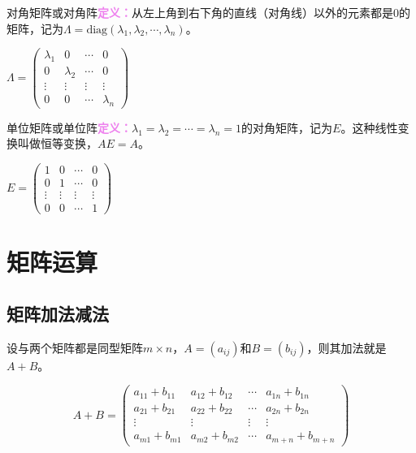 \documentclass[UTF8, 12pt]{ctexart}
\begin{document}
\begin{multicols}{2}
    
    
    对角矩阵或对角阵\textcolor{violet}{\textbf{定义：}}从左上角到右下角的直线（对角线）以外的元素都是0的矩阵，记为$\varLambda=\textrm{diag}(\lambda_1,\lambda_2,\cdots,\lambda_n)$。

    $\varLambda=\left(
        \begin{array}{cccc}
            \lambda_1 & 0 & \cdots & 0 \\
            0 & \lambda_2 & \cdots & 0 \\
            \vdots & \vdots & \vdots & \vdots \\
            0 & 0 & \cdots & \lambda_n
        \end{array}
    \right)$

    单位矩阵或单位阵\textcolor{violet}{\textbf{定义：}}$\lambda_1=\lambda_2=\cdots=\lambda_n=1$的对角矩阵，记为$E$。这种线性变换叫做恒等变换，$AE=A$。 \medskip

    $E=\left(
        \begin{array}{cccc}
            1 & 0 & \cdots & 0 \\
            0 & 1 & \cdots & 0 \\
            \vdots & \vdots & \vdots & \vdots \\
            0 & 0 & \cdots & 1
        \end{array}
    \right)$

\end{multicols}

\section{矩阵运算}

\subsection{矩阵加法减法}

设与两个矩阵都是同型矩阵$m\times n$，$A=(a_{ij})$和$B=(b_{ij})$，则其加法就是$A+B$。

$$A+B=\left(
    \begin{array}{cccc}
        a_{11}+b_{11} & a_{12}+b_{12} & \cdots & a_{1n}+b_{1n} \\
        a_{21}+b_{21} & a_{22}+b_{22} & \cdots & a_{2n}+b_{2n} \\
        \vdots & \vdots & \vdots & \vdots \\
        a_{m1}+b_{m1} & a_{m2}+b_{m2} & \cdots & a_{m+n}+b_{m+n}
    \end{array}
\right)$$
\end{document}
